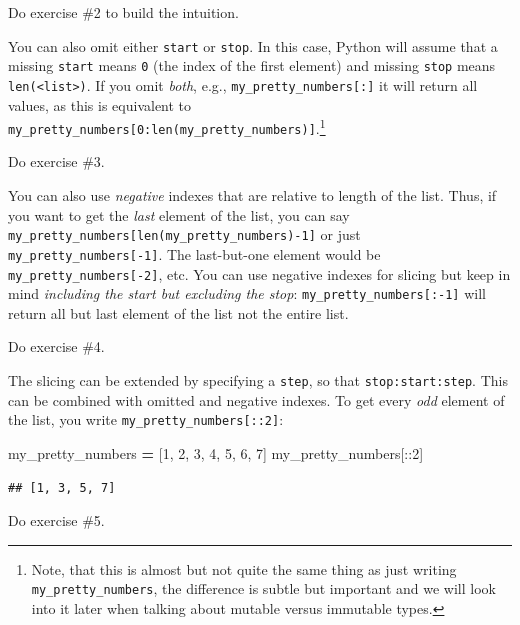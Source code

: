 \documentclass[
]{book}
\newenvironment{Shaded}{\begin{snugshade}}{\end{snugshade}}
\newcommand{\DecValTok}[1]{\textcolor[rgb]{0.00,0.00,0.81}{#1}}
\newcommand{\NormalTok}[1]{#1}
\newcommand{\OperatorTok}[1]{\textcolor[rgb]{0.81,0.36,0.00}{\textbf{#1}}}
\begin{document}
Do exercise \#2 to build the intuition.

You can also omit either \texttt{start} or \texttt{stop}. In this case, Python will assume that a missing \texttt{start} means \texttt{0} (the index of the first element) and missing \texttt{stop} means \texttt{len(\textless{}list\textgreater{})}. If you omit \emph{both}, e.g., \texttt{my\_pretty\_numbers{[}:{]}} it will return all values, as this is equivalent to \texttt{my\_pretty\_numbers{[}0:len(my\_pretty\_numbers){]}}.\footnote{Note, that this is almost but not quite the same thing as just writing \texttt{my\_pretty\_numbers}, the difference is subtle but important and we will look into it later when talking about mutable versus immutable types.}

Do exercise \#3.

You can also use \emph{negative} indexes that are relative to length of the list. Thus, if you want to get the \emph{last} element of the list, you can say \texttt{my\_pretty\_numbers{[}len(my\_pretty\_numbers)-1{]}} or just \texttt{my\_pretty\_numbers{[}-1{]}}. The last-but-one element would be \texttt{my\_pretty\_numbers{[}-2{]}}, etc. You can use negative indexes for slicing but keep in mind \emph{including the start but excluding the stop}: \texttt{my\_pretty\_numbers{[}:-1{]}} will return all but last element of the list not the entire list.

Do exercise \#4.

The slicing can be extended by specifying a \texttt{step}, so that \texttt{stop:start:step}. This can be combined with omitted and negative indexes. To get every \emph{odd} element of the list, you write \texttt{my\_pretty\_numbers{[}::2{]}}:

\begin{Shaded}
\begin{Highlighting}[]
\NormalTok{my\_pretty\_numbers }\OperatorTok{=}\NormalTok{ [}\DecValTok{1}\NormalTok{, }\DecValTok{2}\NormalTok{, }\DecValTok{3}\NormalTok{, }\DecValTok{4}\NormalTok{, }\DecValTok{5}\NormalTok{, }\DecValTok{6}\NormalTok{, }\DecValTok{7}\NormalTok{]}
\NormalTok{my\_pretty\_numbers[::}\DecValTok{2}\NormalTok{]}
\end{Highlighting}
\end{Shaded}

\begin{verbatim}
## [1, 3, 5, 7]
\end{verbatim}

Do exercise \#5.
\end{document}
